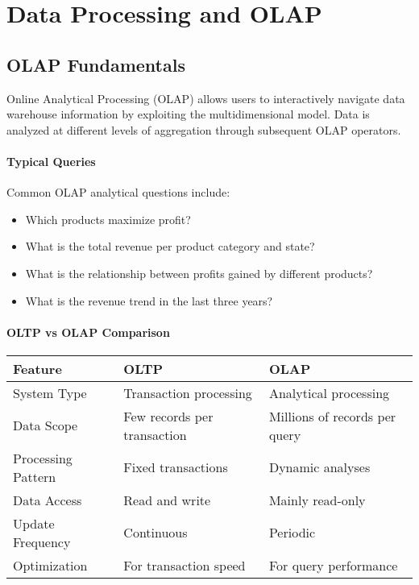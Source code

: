 \documentclass[a4paper,11pt]{article}
\newcommand{\definition}[1]{
  \begin{tcolorbox}[colback=blue!5,colframe=blue!40!black,title=Definition]
    #1
  \end{tcolorbox}
}
\begin{document}
\section{Data Processing and OLAP}

\subsection{OLAP Fundamentals}
\definition{
Online Analytical Processing (OLAP) allows users to interactively navigate data warehouse information by exploiting the multidimensional model. Data is analyzed at different levels of aggregation through subsequent OLAP operators.
}

\paragraph{Typical Queries}
Common OLAP analytical questions include:
\begin{itemize}
    \item Which products maximize profit?
    \item What is the total revenue per product category and state?
    \item What is the relationship between profits gained by different products?
    \item What is the revenue trend in the last three years?
\end{itemize}

\paragraph{OLTP vs OLAP Comparison}
\begin{center}
\begin{tabular}{|p{3.5cm}|p{5cm}|p{5cm}|}
    \hline
    \textbf{Feature} & \textbf{OLTP} & \textbf{OLAP} \\
    \hline
    System Type & Transaction processing & Analytical processing \\
    \hline
    Data Scope & Few records per transaction & Millions of records per query \\
    \hline
    Processing Pattern & Fixed transactions & Dynamic analyses \\
    \hline
    Data Access & Read and write & Mainly read-only \\
    \hline
    Update Frequency & Continuous & Periodic \\
    \hline
    Optimization & For transaction speed & For query performance \\
    \hline
\end{tabular}
\end{center}
\end{document}
